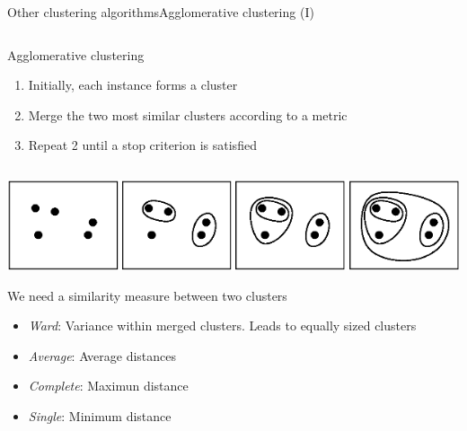\documentclass[10pt,compress]{beamer} %
\begin{document}
\begin{frame}{Other clustering algorithms}{Agglomerative clustering (I)}

    \begin{columns}
            \begin{block}{Agglomerative clustering}
            \begin{enumerate}
                \item Initially, each instance forms a cluster
                \item Merge the two most similar clusters according to a metric
                \item Repeat 2 until a stop criterion is satisfied
            \end{enumerate}
            \end{block}
    \end{columns}

    \medskip
    \begin{center}
	\includegraphics[width=0.7\linewidth]{figs/agglomerative.png}\\
    \end{center}
    \medskip

    We need a similarity measure between two clusters
    \begin{itemize}
        \item \textit{Ward}: Variance within merged clusters. Leads to equally sized clusters
        \item \textit{Average}: Average distances 
        \item \textit{Complete}: Maximun distance 
        \item \textit{Single}: Minimum distance
    \end{itemize}
\end{frame}
\end{document}
